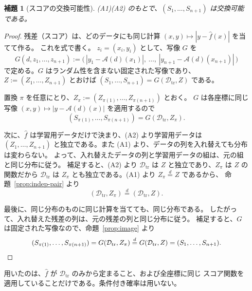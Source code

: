 \documentclass[a4paper,11pt]{jsarticle}
\theoremstyle{definition}
\theoremstyle{plain}
\newtheorem{lemma}[definition]{補題}
\theoremstyle{remark}
\newcommand{\eqd}{\overset{d}{=}}               %
\newcommand{\Dtr}{\mathcal{D}_{\mathrm{tr}}}     %
\newcommand{\fhat}{\hat{f}}
\begin{document}
\begin{lemma}[スコアの交換可能性]
  \label{lem:score-exch}
  (A1)(A2) のもとで、$(S_1,\dots,S_{n+1})$ は交換可能である。
\end{lemma}

\begin{proof}
  残差（スコア）は、どのデータにも同じ計算 $(x,y)\mapsto|y-\fhat(x)|$ を当てて作る。
  これを式で書く。
  $z_i=(x_i,y_i)$ として、写像 $G$ を
  \begin{equation*}
    G(d,z_1,\dots,z_{n+1})
    :=\bigl(\,|y_1-\mathcal{A}(d)(x_1)|,\ \dots,\ |y_{n+1}-\mathcal{A}(d)(x_{n+1})|\,\bigr)
  \end{equation*}
  で定める。$G$ はランダム性を含まない固定された写像であり、
  $Z:=(Z_1,\dots,Z_{n+1})$ とおけば $(S_1,\dots,S_{n+1})=G(\Dtr,Z)$ である。

  置換 $\pi$ を任意にとり、$Z_\pi:=(Z_{\pi(1)},\dots,Z_{\pi(n+1)})$ とおく。
  $G$ は各座標に同じ写像 $(x,y)\mapsto|y-\mathcal{A}(d)(x)|$ を適用するので
  \begin{equation*}
    (S_{\pi(1)},\dots,S_{\pi(n+1)})=G(\Dtr,Z_\pi).
  \end{equation*}

  次に、$\fhat$ は学習用データだけで決まり、(A2) より学習用データは
  $(Z_1,\dots,Z_{n+1})$ と独立である。また (A1) より、データの列を入れ替えても分布は変わらない。
  よって、入れ替えたデータの列と学習用データの組は、元の組と同じ分布に従う。
  補足すると、(A2) より $\Dtr$ は $Z$ と独立であり、$Z_\pi$ は $Z$ の関数だから
  $\Dtr$ は $Z_\pi$ とも独立である。(A1) より $Z_\pi\eqd Z$ であるから、
  命題~\ref{prop:indep-pair} より
  \begin{equation*}
    (\Dtr,Z_\pi)\eqd(\Dtr,Z).
  \end{equation*}

  最後に、同じ分布のものに同じ計算を当てても、同じ分布である。
  したがって、入れ替えた残差の列は、元の残差の列と同じ分布に従う。
  補足すると、$G$ は固定された写像なので、命題~\ref{prop:image} より
  \begin{equation*}
    (S_{\pi(1)},\dots,S_{\pi(n+1)})=G(\Dtr,Z_\pi)\eqd G(\Dtr,Z)=(S_1,\dots,S_{n+1}).
    \qedhere
  \end{equation*}
\end{proof}

用いたのは、$\fhat$ が $\Dtr$ のみから定まること、および全座標に同じ
スコア関数を適用していることだけである。条件付き確率は用いない。
\end{document}
